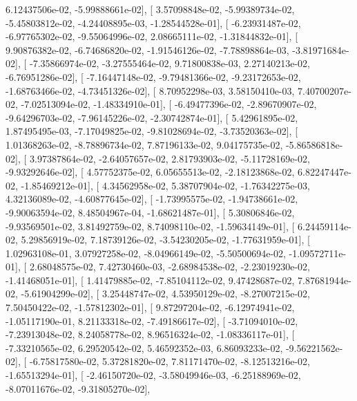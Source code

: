 \documentclass{article}
\begin{document}
          6.12437506e-02,  -5.99888661e-02],
       [  3.57098848e-02,  -5.99389734e-02,  -5.45803812e-02,
         -4.24408895e-03,  -1.28544528e-01],
       [ -6.23931487e-02,  -6.97765302e-02,  -9.55064996e-02,
          2.08665111e-02,  -1.31844832e-01],
       [  9.90876382e-02,  -6.74686820e-02,  -1.91546126e-02,
         -7.78898864e-03,  -3.81971684e-02],
       [ -7.35866974e-02,  -3.27555464e-02,   9.71800838e-03,
          2.27140213e-02,  -6.76951286e-02],
       [ -7.16447148e-02,  -9.79481366e-02,  -9.23172653e-02,
         -1.68763466e-02,  -4.73451326e-02],
       [  8.70952298e-03,   3.58150410e-03,   7.40700207e-02,
         -7.02513094e-02,  -1.48334910e-01],
       [ -6.49477396e-02,  -2.89670907e-02,  -9.64296703e-02,
         -7.96145226e-02,  -2.30742874e-01],
       [  5.42961895e-02,   1.87495495e-03,  -7.17049825e-02,
         -9.81028694e-02,  -3.73520363e-02],
       [  1.01368263e-02,  -8.78896734e-02,   7.87196133e-02,
          9.04175735e-02,  -5.86586818e-02],
       [  3.97387864e-02,  -2.64057657e-02,   2.81793903e-02,
         -5.11728169e-02,  -9.93292646e-02],
       [  4.57752375e-02,   6.05655513e-02,  -2.18123868e-02,
          6.82247447e-02,  -1.85469212e-01],
       [  4.34562958e-02,   5.38707904e-02,  -1.76342275e-03,
          4.32136089e-02,  -4.60877645e-02],
       [ -1.73995575e-02,  -1.94738661e-02,  -9.90063594e-02,
          8.48504967e-04,  -1.68621487e-01],
       [  5.30806846e-02,  -9.93569501e-02,   3.81492759e-02,
          8.74098110e-02,  -1.59634149e-01],
       [  6.24459114e-02,   5.29856919e-02,   7.18739126e-02,
         -3.54230205e-02,  -1.77631959e-01],
       [  1.02963108e-01,   3.07927258e-02,  -8.04966149e-02,
         -5.50500694e-02,  -1.09572711e-01],
       [  2.68048575e-02,   7.42730460e-03,  -2.68984538e-02,
         -2.23019230e-02,  -1.41468051e-01],
       [  1.41479885e-02,  -7.85104112e-02,   9.47428687e-02,
          7.87681944e-02,  -5.61904299e-02],
       [  3.25448747e-02,   4.53950129e-02,  -8.27007215e-02,
          7.50450422e-02,  -1.57812302e-01],
       [  9.87297204e-02,  -6.12974941e-02,  -1.05117190e-01,
          8.21133318e-02,  -7.49186617e-02],
       [ -3.71094010e-02,  -7.23913048e-02,   8.24058778e-02,
          8.96516324e-02,  -1.08336117e-01],
       [ -7.33210565e-02,   6.29520542e-02,   5.46592352e-03,
          6.86093233e-02,  -9.56221562e-02],
       [ -6.75817580e-02,   5.37281820e-02,   7.81171470e-02,
         -8.12513216e-02,  -1.65513294e-01],
       [ -2.46150720e-02,  -3.58049946e-03,  -6.25188969e-02,
         -8.07011676e-02,  -9.31805270e-02],
\end{document}
